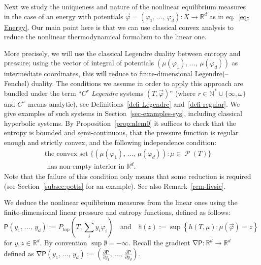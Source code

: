 \documentclass[10pt]{amsart}
\theoremstyle{definition}\newtheorem{defi}[theo]{Definition}\newtheorem{rema}[theo]{Remark}\newtheorem{exam}[theo]{Example}\newtheorem{exem}[theo]{Example}\newtheorem{nota}[theo]{Notation}
\theoremstyle{plain}
\theoremstyle{plain}
\renewcommand\top{{\mathrm{top}}}
\newcommand\Prob{{\operatorname{\mathscr{P}}}}
\newcommand{\grad}{\operatorname{\nabla}}
\newcommand{\hf}{\mathsf{h}}
\newcommand{\Pf}{\mathsf{P}}
\newcommand{\pot}{\varphi}
\newcommand*\8{\infty}
\newcommand\NN{\mathbb{N}}
\newcommand\RR{\mathbb{R}}
\begin{document}
Next we study the uniqueness and nature of the nonlinear equilibrium measures in the case of an energy with potentials $\vec\pot=(\pot_1,\,\dots,\,\pot_d):X\to\RR^d$ as in eq.~\eqref{eq-Energy}. Our main point here is that we can use classical convex analysis to reduce the nonlinear thermodynamical formalism to the linear one.

More precisely, we will use the classical Legendre duality between entropy and pressure; using the vector of integral of potentials $(\mu(\pot_1),\,\dots,\,\mu(\pot_d))$ as intermediate coordinates, this will reduce to finite-dimensional Legendre(--Fenchel) duality. The conditions we assume in order to apply this approach are bundled under the term ``\emph{$C^r$ Legendre} systems $(T,\vec\pot)$'' (where $r\in\NN^*\cup\{\infty,\omega\}$ and $C^\omega$ means analytic), see Definitions~\ref{defi-Legendre} and~\ref{defi-regular}. We give examples of such systems in Section~\ref{sec-examples-sys}, including classical hyperbolic systems. By Proposition~\ref{prop:nlem0} it suffices to check that the entropy is bounded and semi-continuous, that the pressure function is regular enough and strictly convex, and the following independence condition:
\begin{multline}\label{eq-independence}
\text{the convex set }\{(\mu(\pot_1),\,\dots,\,\mu(\pot_d)):\mu\in\Prob(T)\} \\
\text{ has non-empty interior in }\RR^d.
\end{multline}
Note that the failure of this condition only means that some reduction is required (see Section~\ref{subsec:potts} for an example). See also Remark~\ref{rem-livsic}.

We deduce the nonlinear equilibrium measures from the linear ones using the finite-dimensional linear pressure and entropy functions, defined as follows:
\[
\Pf(y_1,\,\dots,\,y_d) := P_\top\left(T,\sum_i y_i\pot_i \right)
\quad\text{and}\quad
\hf(z) :=\sup\left\{h(T,\mu):\mu(\vec\pot)=z\right\}
\]
for $y,z\in\RR^d$. By convention $\sup\emptyset=-\infty$. Recall the gradient $\grad\Pf:\RR^d\to\RR^d$ defined as $\grad\Pf(y_1,\,\dots,\,y_d):=(\frac{\partial\Pf}{\partial y_1},\,\dots,\,\frac{\partial\Pf}{\partial y_d})$.
\end{document}
